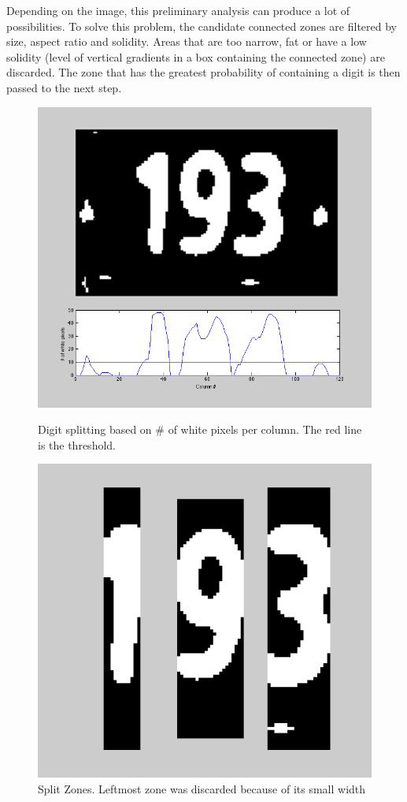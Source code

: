 \documentclass{article} %
\begin{document}
Depending on the image, this preliminary analysis can produce a lot of possibilities. To solve this problem, the candidate connected zones are filtered by size, aspect ratio and solidity. Areas that are too narrow, fat or have a low solidity (level of vertical gradients in a box containing the connected zone) are discarded. The zone that has the greatest probability of containing a digit is then passed to the next step.

\begin{figure}[!htb]
  \includegraphics[width=\linewidth]{images/image08}
  \caption{Digit splitting based on # of white pixels per column. The red line is the threshold.}
  \label{fig:thres}
\endminipage\hfill
{}
  \includegraphics[width=\linewidth]{images/image04}
  \caption{Split Zones. Leftmost zone was discarded because of its small width}
  \label{fig:split}
\endminipage\hfill
\end{figure}
\end{document}
